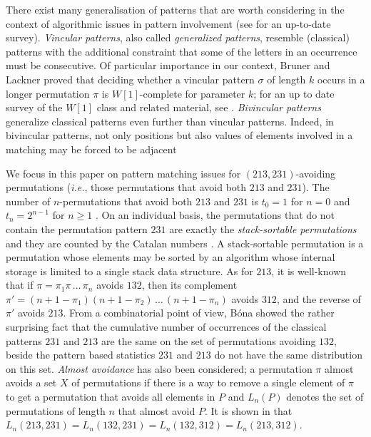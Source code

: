 \documentclass[a4paper]{llncs}
\newcounter{num}
\begin{document}
	There exist many generalisation of patterns that are worth considering
	in the context of algorithmic issues in pattern involvement
	(see \cite{Kitaev:book:2011} for an up-to-date survey).
	\emph{Vincular patterns}, also called
	\emph{generalized patterns},
	resemble (classical) patterns with the additional constraint that some of the letters in
	an occurrence must be consecutive.
	Of particular importance in our context,
	Bruner and Lackner \cite{Bruner:Lackner:SWAT:2012}
	proved that deciding whether a vincular pattern
	$\sigma$ of length $k$ occurs in a longer permutation
	$\pi$ is $W[1]$-complete for
	parameter $k$;
	for an up to date survey of the $W[1]$ class and related material, see
	\cite{Downey:Fellows:2013}.
	\emph{Bivincular patterns} generalize classical patterns even further
	than vincular
	patterns. Indeed, in bivincular patterns,
	not only positions but also values
	of elements involved in a matching may be forced to be adjacent

	We focus in this paper on pattern matching issues for
	$(213,231)$-avoiding permutations
    (\emph{i.e.}, those permutations that avoid both $213$ and $231$).
	The number of $n$-permutations that avoid both
	$213$ and $231$ is
	$t_0 = 1$ for $n = 0$ and
	$t_n =2^{n-1}$ for $n\geq 1$ \cite{Simion:Schmidt:EJC:1985}.
	On an individual basis,
	the permutations that do not contain the permutation pattern $231$
	are exactly the \emph{stack-sortable permutations} and they are counted by
	the Catalan numbers \cite{Knuth:1997:ACP:260999}.
	A stack-sortable permutation is a permutation whose elements may be sorted by
	an algorithm whose internal storage is limited to a single stack data structure.
	As for $213$, it is well-known that
 	if $\pi = \pi_1\pi\,\ldots\,\pi_n$ avoids $132$, then its complement
 	$\pi' = (n+1-\pi_1)(n+1-\pi_2)\,\ldots\,(n+1-\pi_n)$ avoids $312$, and
 	the reverse of $\pi'$ avoids $213$.
 	From a combinatorial point of view,
 	B\'ona \cite{Bona:ElJC:2012}
 	showed the rather surprising fact that the cumulative number of
 	occurrences of the classical patterns $231$ and $213$ are the same on the
 	set of permutations avoiding $132$,
 	beside the pattern based statistics $231$ and $213$
 	do not have the same distribution on this set.
 	\emph{Almost avoidance} has also been considered;
 	a permutation $\pi$ almost avoids a set $X$ of permutations
 	if there is a way to remove a single element of $\pi$ to get a permutation
 	that avoids all elements in $P$
 	and $L_n(P)$ denotes the set of permutations of length $n$ that almost avoid
 	$P$.
 	It is shown in \cite{Griffiths:Smith:Warren:PMA:2011} that
 	$L_n(213, 231) = L_n(132, 231) = L_n(132, 312) = L_n(213, 312)$.
\end{document}
